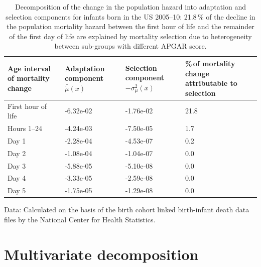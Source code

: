 \documentclass[12pt, parskip=half]{scrartcl}
\begin{document}
\begin{table}[!htb]
  \tabformat
  \begin{threeparttable}
    \begin{tabular}{p{2.5cm}p{2cm}p{2cm}p{2.7cm}}
      \toprule
      Age interval of mortality change & Adaptation component $\bar{\dot{\mu}}(x)$ & Selection component $-\sigma^2_\mu(x)$ & \%\,of mortality change attributable to selection \\
      \midrule
      First hour of life & -6.32e-02 & -1.76e-02 & 21.8 \\
      Hours 1--24        & -4.24e-03 & -7.50e-05 &  1.7 \\
      Day 1              & -2.28e-04 & -4.53e-07 &  0.2 \\
      Day 2              & -1.08e-04 & -1.04e-07 &  0.0 \\
      Day 3              & -5.88e-05 & -5.10e-08 &  0.0 \\
      Day 4              & -3.33e-05 & -2.59e-08 &  0.0 \\
      Day 5              & -1.75e-05 & -1.29e-08 &  0.0 \\
      \bottomrule
    \end{tabular}
    \begin{tablenotes} \tabfontsizefoot
      \item Data: Calculated on the basis of the birth cohort linked birth-infant death data files by the National Center for Health Statistics.
    \end{tablenotes}
    \caption{Decomposition of the change in the population hazard into adaptation and selection components for infants born in the US 2005--10: 21.8\,\% of the decline in the population mortality hazard between the first hour of life and the remainder of the first day of life are explained by mortality selection due to heterogeneity between sub-groups with different APGAR score.}
    \label{tab:decomp}
  \end{threeparttable}
\end{table}

\section{Multivariate decomposition}
\end{document}
